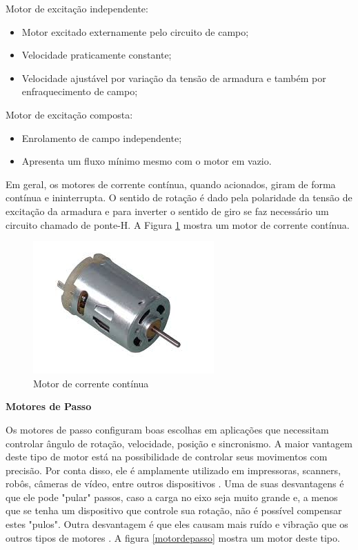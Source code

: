 \begin{anexosenv}
\noindent
Motor de excitação independente:
\begin{itemize}
	\item Motor excitado externamente pelo circuito de campo;
	\item Velocidade praticamente constante;
	\item Velocidade ajustável por variação da tensão de armadura e também por enfraquecimento de campo;
\end{itemize}

\noindent
Motor de excitação composta:
\begin{itemize}
	\item Enrolamento de campo independente;
	\item Apresenta um fluxo mínimo mesmo com o motor em vazio.
\end{itemize}

Em geral, os motores de corrente contínua, quando acionados, giram de forma contínua e ininterrupta. O sentido de rotação é dado pela polaridade da tensão de excitação da armadura e para inverter o sentido de giro se faz necessário um circuito chamado de ponte-H. A Figura \ref{fig21} mostra um motor de corrente contínua.

\begin{figure}[htb]
		\centering
			\includegraphics[scale=0.9]{figuras/motores3.png}
		\caption{Motor de corrente contínua}
		\label{fig21}
\end{figure}




\textbf{Motores de Passo}

Os motores de passo configuram boas escolhas em aplicações que necessitam controlar ângulo de rotação, velocidade, posição e sincronismo. A maior vantagem deste tipo de motor está na possibilidade de controlar seus movimentos com precisão. Por conta disso, ele é amplamente utilizado em impressoras, scanners, robôs, câmeras de vídeo, entre outros dispositivos \cite{brites}. Uma de suas desvantagens é que ele pode "pular" passos, caso a carga no eixo seja muito grande e, a menos que se tenha um dispositivo que controle sua rotação, não é possível compensar estes "pulos". Outra desvantagem é que eles causam mais ruído e vibração que os outros tipos de motores \cite{nippon}. A figura \ref{motordepasso} mostra um motor deste tipo.


\end{anexosenv}
